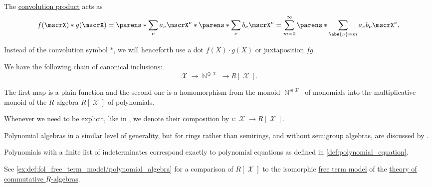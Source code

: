 \begin{definition}
\begin{thmenum}
    The \hyperref[def:semigroup_algebra]{convolution product} acts as
    \begin{equation}\label{eq:def:polynomial_algebra/polynomials/product}
      f(\mscrX) \ast g(\mscrX)
      =
      \parens*{ \sum_\nu a_\nu \mscrX^\nu } \ast \parens*{ \sum_\nu b_\nu \mscrX^\nu }
      =
      \sum_{m=0}^\infty \parens*{ \sum_{\abs{\nu} = m } a_\nu b_\nu } \mscrX^\nu,
    \end{equation}

    Instead of the convolution symbol \( {\ast} \), we will henceforth use a dot \( f(X) \cdot g(X) \) or juxtaposition \( fg \).

     We have the following chain of canonical inclusions:
    \begin{equation*}
      \mscrX \to \BbbN^{\oplus \mscrX} \to R[\mscrX].
    \end{equation*}

    The first map is a plain function and the second one is a homomorphism from the monoid \( \BbbN^{\oplus \mscrX} \) of monomials into the multiplicative monoid of the \( R \)-algebra \( R[\mscrX] \) of polynomials.

    Whenever we need to be explicit, like in , we denote their composition by \( \iota: \mscrX \to R[\mscrX] \).
  \end{thmenum}
\end{definition}
\begin{comments}
  \item Polynomial algebras in a similar level of generality, but for rings rather than semirings, and without semigroup algebras, are discussed by \textcite[\S III.9]{Bourbaki1998Algebra1to3}.

  \item Polynomials with a finite list of indeterminates correspond exactly to polynomial equations as defined in \cref{def:polynomial_equation}.

  \item See \cref{ex:def:fol_free_term_model/polynomial_algebra} for a comparison of \( R[\mscrX] \) to the isomorphic \hyperref[def:fol_free_term_model]{free term model} of the \hyperref[def:algebra_over_semiring/commutative]{theory of commutative \( R \)-algebras}.
\end{comments}

